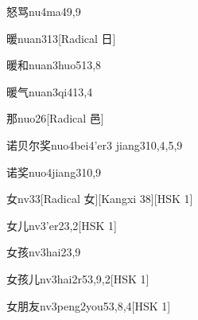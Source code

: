 \begin{entry}{怒骂}{nu4ma4}{9,9}
\end{entry}

\begin{entry}{暖}{nuan3}{13}[Radical 日]
\end{entry}

\begin{entry}{暖和}{nuan3huo5}{13,8}
\end{entry}

\begin{entry}{暖气}{nuan3qi4}{13,4}
\end{entry}

\begin{entry}{那}{nuo2}{6}[Radical 邑]
\end{entry}

\begin{entry}{诺贝尔奖}{nuo4bei4'er3 jiang3}{10,4,5,9}
\end{entry}

\begin{entry}{诺奖}{nuo4jiang3}{10,9}
\end{entry}

\begin{entry}{女}{nv3}{3}[Radical 女][Kangxi 38][HSK 1]
\end{entry}

\begin{entry}{女儿}{nv3'er2}{3,2}[HSK 1]
\end{entry}

\begin{entry}{女孩}{nv3hai2}{3,9}
\end{entry}

\begin{entry}{女孩儿}{nv3hai2r5}{3,9,2}[HSK 1]
\end{entry}

\begin{entry}{女朋友}{nv3peng2you5}{3,8,4}[HSK 1]
\end{entry}

